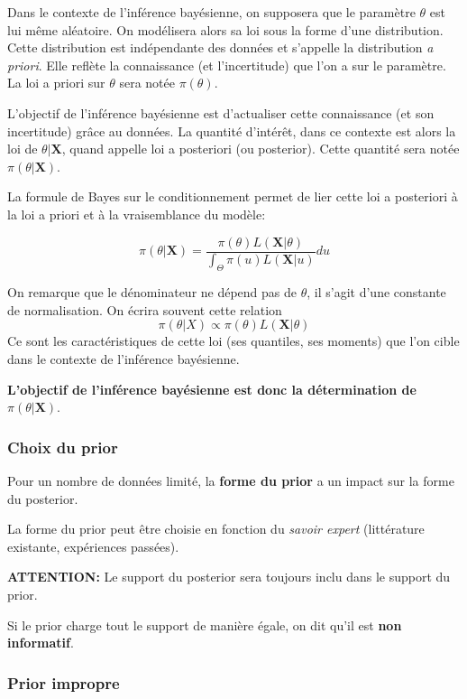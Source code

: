 \documentclass[]{article}
\begin{document}
Dans le contexte de l'inférence bayésienne, on supposera que le
paramètre \(\theta\) est lui même aléatoire. On modélisera alors sa loi
sous la forme d'une distribution. Cette distribution est indépendante
des données et s'appelle la distribution \textit{a priori}. Elle reflète
la connaissance (et l'incertitude) que l'on a sur le paramètre. La loi a
priori sur \(\theta\) sera notée \(\pi(\theta)\).

L'objectif de l'inférence bayésienne est d'actualiser cette connaissance
(et son incertitude) grâce au données. La quantité d'intérêt, dans ce
contexte est alors la loi de \(\theta\vert \mathbf{X}\), quand appelle
loi a posteriori (ou posterior). Cette quantité sera notée
\(\pi(\theta \vert \mathbf{X})\).

La formule de Bayes sur le conditionnement permet de lier cette loi a
posteriori à la loi a priori et à la vraisemblance du modèle:

\[\pi(\theta\vert \mathbf{X}) = \frac{\pi(\theta)L(\mathbf{X}\vert \theta)}{\int_\Theta \pi(u)L(\mathbf{X}\vert u)} d u\]

On remarque que le dénominateur ne dépend pas de \(\theta\), il s'agit
d'une constante de normalisation. On écrira souvent cette relation
\[\pi(\theta \vert X) \propto \pi(\theta)L(\mathbf{X}\vert \theta)\] Ce
sont les caractéristiques de cette loi (ses quantiles, ses moments) que
l'on cible dans le contexte de l'inférence bayésienne.

\textbf{L'objectif de l'inférence bayésienne est donc la détermination
de \(\pi(\theta\vert \mathbf{X})\)}.

\hypertarget{choix-du-prior}{%
\subsubsection{Choix du prior}\label{choix-du-prior}}

Pour un nombre de données limité, la \textbf{forme du prior} a un impact
sur la forme du posterior.

La forme du prior peut être choisie en fonction du \emph{savoir expert}
(littérature existante, expériences passées).

\textbf{ATTENTION:} Le support du posterior sera toujours inclu dans le
support du prior.

Si le prior charge tout le support de manière égale, on dit qu'il est
\textbf{non informatif}.

\hypertarget{prior-impropre}{%
\subsubsection{Prior impropre}\label{prior-impropre}}
\end{document}
